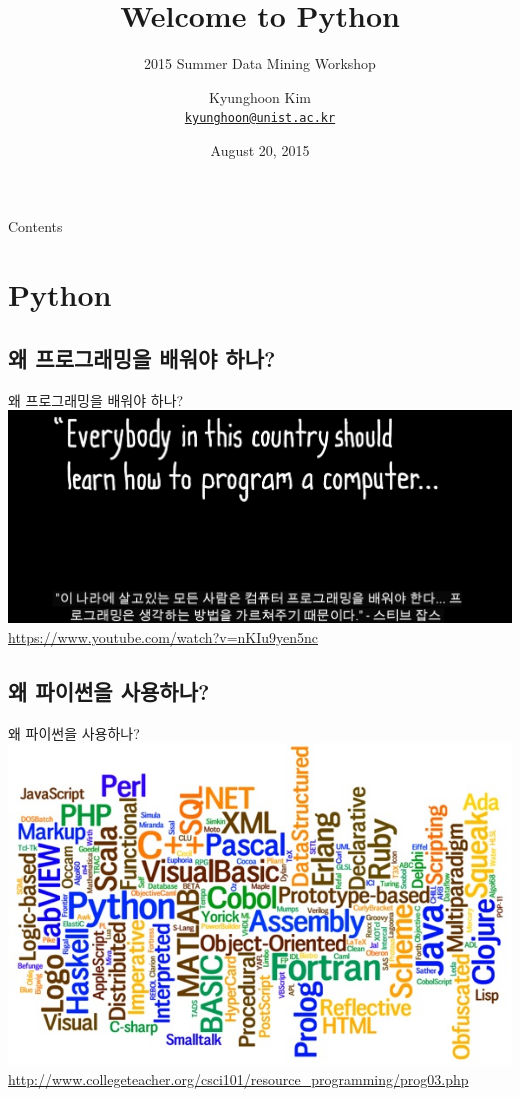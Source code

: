 \documentclass[10pt]{beamer}
\title{Welcome to Python}
\subtitle{2015 Summer Data Mining Workshop}  %
\date{August 20, 2015}
\author{
  Kyunghoon Kim\\
  \href{mailto:kyunghoon@unist.ac.kr}{{\tt kyunghoon@unist.ac.kr}}
}
\institute[
  Dept.\ of Mathematical Sciences\\
  UNIST\\
  Republic of Korea
] %
{%
  Department of Mathematical Sciences\\
  Ulsan National Institute of Science and Technology\\
  Republic of Korea
  
}
\begin{document}
{\aauwavesbg%
\begin{frame} %
  \titlepage
\end{frame}}

\begin{frame}{Contents}{}
\tableofcontents
\end{frame}

\section{Python}
\subsection{왜 프로그래밍을 배워야 하나?}
\begin{frame}{왜 프로그래밍을 배워야 하나?}{}
	\centering
	\includegraphics[scale=0.25]{contents/program.jpg}\\
	\url{https://www.youtube.com/watch?v=nKIu9yen5nc}
\end{frame}

\subsection{왜 파이썬을 사용하나?}
\begin{frame}{왜 파이썬을 사용하나?}{}
	\centering
	\vspace{3mm}
	\includegraphics[scale=0.51]{contents/progLanguages.jpg}\\
	\tiny{\url{http://www.collegeteacher.org/csci101/resource_programming/prog03.php}}
\end{frame}
\end{document}
